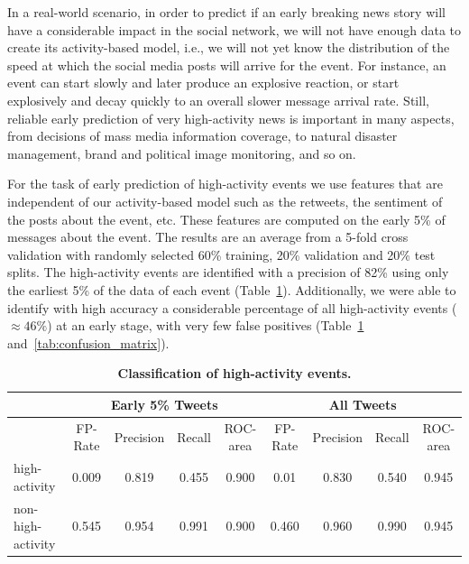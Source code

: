 
In a real-world scenario, in order to predict if an early breaking news story
will have a considerable impact in the social network, we will not have enough
data to create its activity-based model, i.e., we will not yet know the
distribution of the speed at which the social media posts will arrive for the
event. 
%
For instance, an event can start slowly and later produce an explosive reaction,
or start explosively and decay quickly to an overall slower message arrival
rate. 
%
Still, reliable early prediction of very high-activity news is important in many
aspects, from decisions of mass media information coverage, to natural disaster
management, brand and political image monitoring, and so on.


For the task of early prediction of high-activity events we use features that
are independent of our activity-based model such as the retweets, the sentiment
of the posts about the event, etc. These features are computed on the early 5\%
of messages about the event.
%
The results are an average from a 5-fold cross validation with randomly selected
60\% training, 20\% validation and 20\% test splits. 
%
The high-activity events are identified with a precision of 82\% using only the
earliest 5\% of the data of each event (Table~\ref{tab:classification_results}).
%
Additionally, we were able to identify with high accuracy a considerable
percentage of all high-activity events ($\approx 46\%$) at an early stage, with
very few false positives (Table~\ref{tab:classification_results}
and~\ref{tab:confusion_matrix}).

\begin{table}[!htb]
  \centering
  {\small
    \begin{tabularx}{\textwidth}{lcccc|cccc}
      \toprule
      & \multicolumn{4}{c}{\textbf{Early 5\% Tweets}} & \multicolumn{4}{c}{\textbf{All Tweets}} \\
      \midrule
      & FP-Rate & Precision & Recall & ROC-area & FP-Rate & Precision & Recall & ROC-area \\
      high-activity & 0.009 & 0.819 & 0.455 & 0.900 & 0.01 & 0.830 & 0.540 & 0.945 \\
      non-high-activity & 0.545 & 0.954 & 0.991 & 0.900 &  0.460 & 0.960 & 0.990 & 0.945 \\
      \bottomrule
    \end{tabularx}
  }
  \caption{\textbf{Classification of high-activity events.}}
  \label{tab:classification_results}
\end{table}

